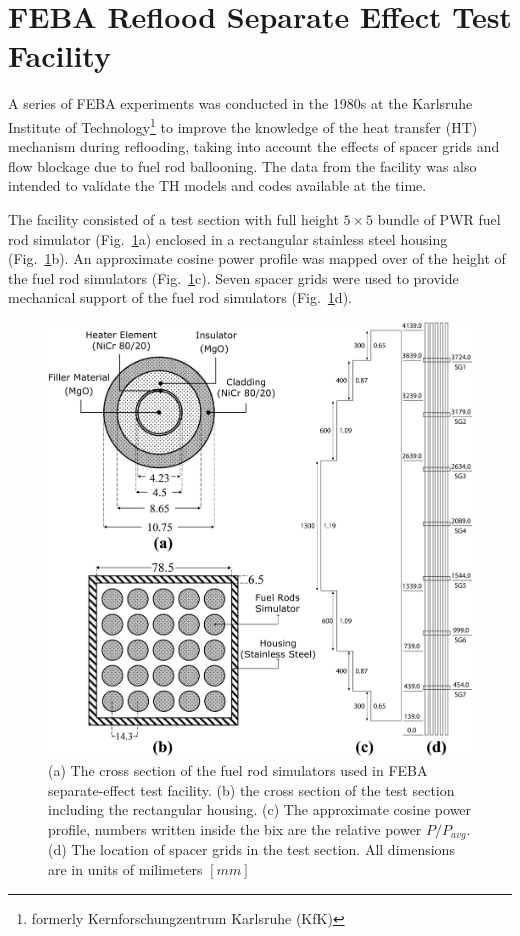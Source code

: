 \section{FEBA Reflood Separate Effect Test Facility}\label{sec:reflood_feba_setf}

A series of FEBA experiments was conducted in the 1980s at the Karlsruhe Institute of Technology\footnote{formerly Kernforschungzentrum Karlsruhe (KfK)}
to improve the knowledge of the heat transfer (\textsc{HT}) mechanism during reflooding,
taking into account the effects of spacer grids and flow blockage due to fuel rod ballooning.
The data from the facility was also intended to validate the TH models and codes available at the time.

The facility consisted of a test section with full height $5 \times 5$ bundle of \textsc{PWR} fuel rod simulator (Fig.~\ref{fig:feba_setf}a) enclosed in a rectangular stainless steel housing (Fig.~\ref{fig:feba_setf}b).
An approximate cosine power profile was mapped over of the height of the fuel rod simulators (Fig.~\ref{fig:feba_setf}c).
Seven spacer grids were used to provide mechanical support of the fuel rod simulators (Fig.~\ref{fig:feba_setf}d).

\begin{figure}[bth]
	\includegraphics[width=1.0\textwidth]{../figures/febaTestSection/febaTestSection.png}
	\caption[FEBA experimental facility]{(a) The cross section of the fuel rod simulators used in FEBA separate-effect test facility. (b) the cross section of the test section including the rectangular housing. (c)  The approximate cosine power profile, numbers written inside the bix are the relative power $P/P_{avg}$. (d) The location of spacer grids in the test section. All dimensions are in units of milimeters $[mm]$}\label{fig:feba_setf}
\end{figure}

